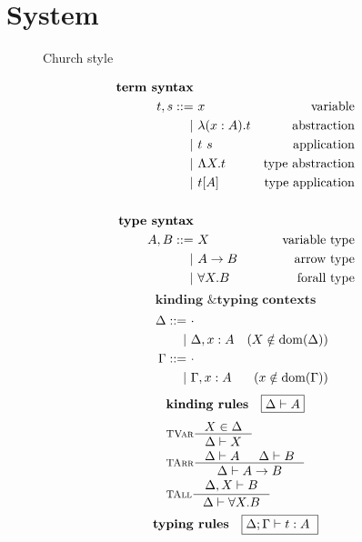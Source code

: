 \section{System \F} \label{sec:f}
\begin{figure}
\begin{singlespace}
\begin{minipage}{.46\textwidth}
	\begin{center}Church style\end{center}
\def\baselinestretch{0}
\small
\begin{align*}
\textbf{term syntax} \\
t,s ::= &~ x           & \text{variable}    \\
      | &~ \lambda(x:A) . t & \text{abstraction} \\
      | &~ t ~ s       & \text{application} \\
      | &~ \Lambda X    . t & \text{type abstraction} \\
      | &~ t [A]       & \text{type application} \\
\\
\textbf{type syntax} \\
A,B ::= &~ X           & \text{variable type}   \\
      | &~ A -> B      & \text{arrow type} \\
      | &~ \forall X.B & \text{forall type}   \\
\end{align*}
\[ \textbf{kinding \& typing contexts} \]\vspace*{-1em}
\begin{align*}\quad
\Delta ::= &~ \cdot \\
	 | &~ \Delta, x:A & (X\notin \mathop{\mathrm{dom}}(\Delta)) \\
\Gamma ::= &~ \cdot \\
	 | &~ \Gamma, x:A & (x\notin \mathop{\mathrm{dom}}(\Gamma)) \\
\end{align*}
\[ \textbf{kinding rules} \quad \framebox{$ \Delta |- A $} \]\vspace*{-1em}
\begin{align*}
& \inference[\sc TVar]{X \in \Delta}{\Delta |- X} \\
& \inference[\sc TArr]{\Delta |- A & \Delta |- B}{\Delta |- A -> B} \\
& \inference[\sc TAll]{\Delta,X |- B}{\Delta |- \forall X.B} \\
\end{align*}
\[ \textbf{typing rules} \quad \framebox{$ \Delta;\Gamma |- t : A $ } \]

\end{minipage}
\end{singlespace}
\end{figure}
